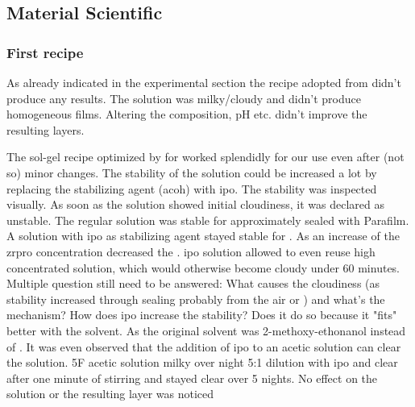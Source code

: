 \subsection{Material Scientific}
\subsubsection{First recipe} 
As already indicated in the experimental section the recipe adopted from \cite{Anwar2017} didn't produce any  results. 
The solution was milky/cloudy and didn't produce homogeneous films. 
Altering the composition, pH etc. didn't improve the resulting layers. 

The sol-gel recipe optimized by \cite{Hu2016} for  worked splendidly for our use even after (not so) minor changes.
The stability of the solution could be increased a lot by replacing the stabilizing agent (\gls{acoh}) with \gls{ipo}.
The stability was inspected visually. 
As soon as the solution showed initial cloudiness, it was declared as unstable. 
The regular solution was stable for approximately  sealed with Parafilm. 
A solution with \gls{ipo} as stabilizing agent stayed stable for . 
As an increase of the \gls{zrpro} concentration decreased the . 
\Gls{ipo} solution allowed to even reuse high concentrated solution, which would otherwise become cloudy under 60 minutes. 
Multiple question still need to be answered: 
What causes the cloudiness (as stability increased through sealing probably  from the air or ) and what's the mechanism? 
How does \gls{ipo} increase the stability? 
Does it do so because it "fits" better with the solvent. 
As the original solvent was 2-methoxy-ethonanol instead of . 
It was even observed that the addition of  \gls{ipo} to an acetic solution can clear the solution.
5F acetic solution milky over night 5:1 dilution with \gls{ipo} and clear after one minute of stirring and stayed clear over 5 nights.
No effect on the solution or the resulting layer was noticed 

